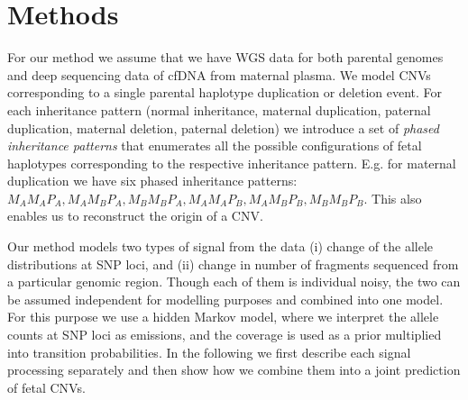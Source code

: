 \section{Methods}
For our method we assume that we have WGS data for both parental genomes and deep sequencing data of cfDNA from maternal plasma. We model CNVs corresponding to a single parental haplotype duplication or deletion event. For each inheritance pattern (normal inheritance, maternal duplication, paternal duplication, maternal deletion, paternal deletion) we introduce a set of \emph{phased inheritance patterns} that enumerates all the possible configurations of fetal haplotypes corresponding to the respective inheritance pattern. E.g. for maternal duplication we have six phased inheritance patterns: $M_AM_AP_A, M_AM_BP_A, M_BM_BP_A, M_AM_AP_B, M_AM_BP_B, M_BM_BP_B$. This also enables us to reconstruct the origin of a CNV.

Our method models two types of signal from the data (i) change of the allele distributions at SNP loci, and (ii) change in number of fragments sequenced from a particular genomic region. Though each of them is individual noisy, the two can be assumed independent for modelling purposes and combined into one model. For this purpose we use a hidden Markov model, where we interpret the allele counts at SNP loci as emissions, and the coverage is used as a prior multiplied into transition probabilities. In the following we first describe each signal processing separately and then show how we combine them into a joint prediction of fetal CNVs.

